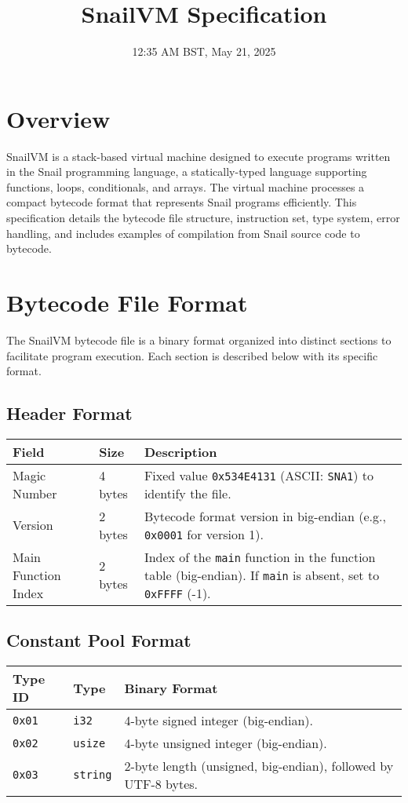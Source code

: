 \documentclass[a4paper,12pt]{article}
\title{\textbf{SnailVM Specification}}
\author{}
\date{12:35 AM BST, May 21, 2025} %
\begin{document}
\maketitle
\tableofcontents
\clearpage

\section{Overview}
  SnailVM is a stack-based virtual machine designed to execute programs written in the Snail programming language, a statically-typed language supporting functions, loops, conditionals, and arrays. The virtual machine processes a compact bytecode format that represents Snail programs efficiently. This specification details the bytecode file structure, instruction set, type system, error handling, and includes examples of compilation from Snail source code to bytecode.

\section{Bytecode File Format}
  The SnailVM bytecode file is a binary format organized into distinct sections to facilitate program execution. Each section is described below with its specific format.

\subsection{Header Format}
\begin{tabular}{|l|l|p{6cm}|}
\hline
\textbf{Field} & \textbf{Size} & \textbf{Description} \\ \hline
  Magic Number & 4 bytes & Fixed value \texttt{0x534E4131} (ASCII: \texttt{SNA1}) to identify the file. \\ \hline
  Version & 2 bytes & Bytecode format version in big-endian (e.g., \texttt{0x0001} for version 1). \\ \hline
  Main Function Index & 2 bytes & Index of the \texttt{main} function in the function table (big-endian). If \texttt{main} is absent, set to \texttt{0xFFFF} (-1). \\ \hline
\end{tabular}
\label{tab:header_format}

\subsection{Constant Pool Format}
\begin{tabular}{|l|l|p{6cm}|}
\hline
\textbf{Type ID} & \textbf{Type} & \textbf{Binary Format} \\ \hline
\texttt{0x01} & \texttt{i32} & 4-byte signed integer (big-endian). \\ \hline
\texttt{0x02} & \texttt{usize} & 4-byte unsigned integer (big-endian). \\ \hline
\texttt{0x03} & \texttt{string} & 2-byte length (unsigned, big-endian), followed by UTF-8 bytes. \\ \hline
\end{tabular}
\label{tab:constant_pool_format}
\end{document}
